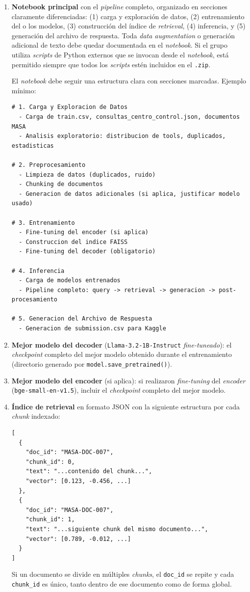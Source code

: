 \documentclass{article}
\begin{document}
\begin{enumerate}
    \item \textbf{Notebook principal} con el \textit{pipeline} completo, organizado en secciones claramente diferenciadas: (1) carga y exploración de datos, (2) entrenamiento del o los modelos, (3) construcción del índice de \textit{retrieval}, (4) inferencia, y (5) generación del archivo de respuesta. Toda \textit{data augmentation} o generación adicional de texto debe quedar documentada en el \textit{notebook}. Si el grupo utiliza \textit{scripts} de Python externos que se invocan desde el \textit{notebook}, está permitido siempre que todos los \textit{scripts} estén incluidos en el \texttt{.zip}.

    El \textit{notebook} debe seguir una estructura clara con secciones marcadas. Ejemplo mínimo:
    \begin{lstlisting}
# 1. Carga y Exploracion de Datos
  - Carga de train.csv, consultas_centro_control.json, documentos MASA
  - Analisis exploratorio: distribucion de tools, duplicados, estadisticas

# 2. Preprocesamiento
  - Limpieza de datos (duplicados, ruido)
  - Chunking de documentos
  - Generacion de datos adicionales (si aplica, justificar modelo usado)

# 3. Entrenamiento
  - Fine-tuning del encoder (si aplica)
  - Construccion del indice FAISS
  - Fine-tuning del decoder (obligatorio)

# 4. Inferencia
  - Carga de modelos entrenados
  - Pipeline completo: query -> retrieval -> generacion -> post-procesamiento

# 5. Generacion del Archivo de Respuesta
  - Generacion de submission.csv para Kaggle
    \end{lstlisting}
    \item \textbf{Mejor modelo del decoder} (\texttt{Llama-3.2-1B-Instruct} \textit{fine-tuneado}): el \textit{checkpoint} completo del mejor modelo obtenido durante el entrenamiento (directorio generado por \texttt{model.save\_pretrained()}).
    \item \textbf{Mejor modelo del encoder} (si aplica): si realizaron \textit{fine-tuning} del \textit{encoder} (\texttt{bge-small-en-v1.5}), incluir el \textit{checkpoint} completo del mejor modelo.
    \item \textbf{Índice de retrieval} en formato JSON con la siguiente estructura por cada \textit{chunk} indexado:
    \begin{lstlisting}
[
  {
    "doc_id": "MASA-DOC-007",
    "chunk_id": 0,
    "text": "...contenido del chunk...",
    "vector": [0.123, -0.456, ...]
  },
  {
    "doc_id": "MASA-DOC-007",
    "chunk_id": 1,
    "text": "...siguiente chunk del mismo documento...",
    "vector": [0.789, -0.012, ...]
  }
]
    \end{lstlisting}
    Si un documento se divide en múltiples \textit{chunks}, el \texttt{doc\_id} se repite y cada \texttt{chunk\_id} es único, tanto dentro de ese documento como de forma global.
\end{enumerate}
\end{document}
